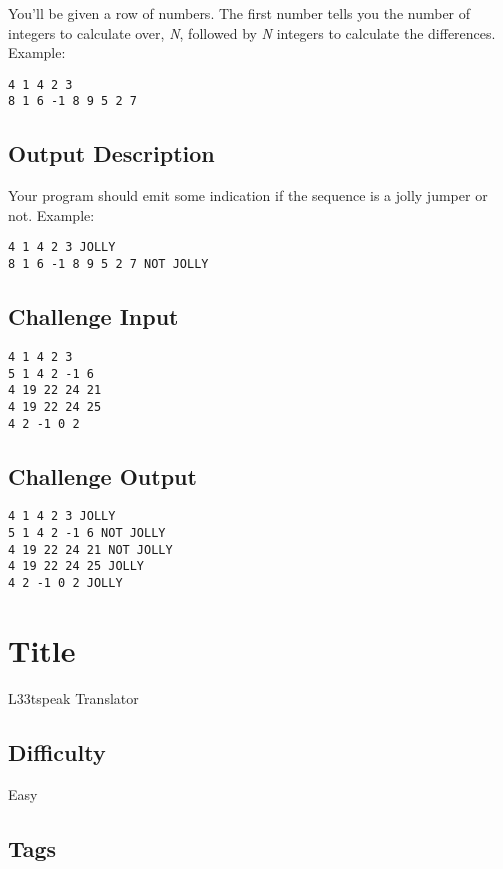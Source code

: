 You'll be given a row of numbers. The first number tells you the number
of integers to calculate over, \emph{N}, followed by \emph{N} integers
to calculate the differences. Example:

\begin{verbatim}
4 1 4 2 3
8 1 6 -1 8 9 5 2 7
\end{verbatim}

\subsection{Output Description}\label{output-description-22}

Your program should emit some indication if the sequence is a jolly
jumper or not. Example:

\begin{verbatim}
4 1 4 2 3 JOLLY
8 1 6 -1 8 9 5 2 7 NOT JOLLY
\end{verbatim}

\subsection{Challenge Input}\label{challenge-input-23}

\begin{verbatim}
4 1 4 2 3
5 1 4 2 -1 6
4 19 22 24 21
4 19 22 24 25
4 2 -1 0 2
\end{verbatim}

\subsection{Challenge Output}\label{challenge-output-20}

\begin{verbatim}
4 1 4 2 3 JOLLY
5 1 4 2 -1 6 NOT JOLLY
4 19 22 24 21 NOT JOLLY
4 19 22 24 25 JOLLY
4 2 -1 0 2 JOLLY
\end{verbatim}

\section{Title}\label{title-30}

L33tspeak Translator

\subsection{Difficulty}\label{difficulty-29}

Easy

\subsection{Tags}\label{tags-30}

